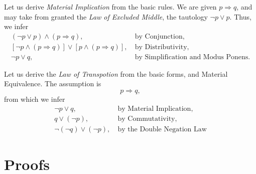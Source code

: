 \begin{example}
Let us derive \textit{Material Implication} from the basic rules. We are given $p \Rightarrow q$, and may take from granted the \textit{Law of Excluded Middle}, the tautology $\neg p \lor p$. Thus, we infer 
\begin{align*}
(\neg p \lor p) \land (p \Rightarrow q),  & \ \mbox{by Conjunction},\\
[\neg p \land (p \Rightarrow q)] \lor [p \land (p \Rightarrow q)], & \ \mbox{by Distributivity},\\
\neg p \lor q, & \ \mbox{by Simplification and Modus Ponens}.
\end{align*}
\end{example}

\begin{example}
Let us derive the \textit{Law of Transpotion} from the basic forms, and Material Equivalence. The assumption is 
\begin{equation*}
p \Rightarrow q,
\end{equation*}
from which we infer
\begin{align*}
\neg p \lor q, & \ \mbox{by Material Implication},\\
q \lor (\neg p), & \ \mbox{by Commutativity}, \\
\neg (\neg q) \lor (\neg p), & \ \mbox{by the Double Negation Law}
\end{align*}
\end{example}
\section{Proofs}

